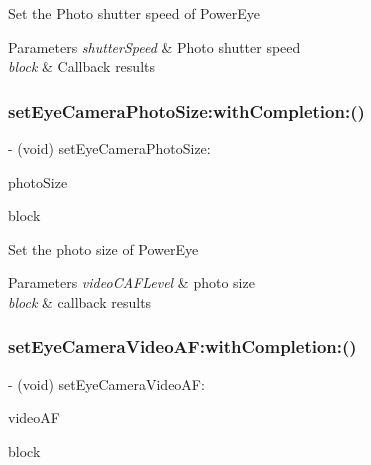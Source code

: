Set the Photo shutter speed of Power\+Eye


\begin{DoxyParams}{Parameters}
{\em shutter\+Speed} & Photo shutter speed \\
\hline
{\em block} & Callback results \\
\hline
\end{DoxyParams}
\mbox{\label{interface_p_v_camera_a6ffba1f6705e5bec4023b843e7e0d6d1}} 
\subsubsection{\texorpdfstring{set\+Eye\+Camera\+Photo\+Size\+:with\+Completion\+:()}{setEyeCameraPhotoSize:withCompletion:()}}
{\footnotesize\ttfamily -\/ (void) set\+Eye\+Camera\+Photo\+Size\+: \begin{DoxyParamCaption}\item[{(P\+V\+Camera\+Photo\+Size)}]{photo\+Size }\item[{withCompletion:(P\+V\+Completion\+Block)}]{block }\end{DoxyParamCaption}}

Set the photo size of Power\+Eye


\begin{DoxyParams}{Parameters}
{\em video\+C\+A\+F\+Level} & photo size \\
\hline
{\em block} & callback results \\
\hline
\end{DoxyParams}
\mbox{\label{interface_p_v_camera_ad967efa7d2d065bb1a5674a8ce139f7b}} 
\subsubsection{\texorpdfstring{set\+Eye\+Camera\+Video\+A\+F\+:with\+Completion\+:()}{setEyeCameraVideoAF:withCompletion:()}}
{\footnotesize\ttfamily -\/ (void) set\+Eye\+Camera\+Video\+A\+F\+: \begin{DoxyParamCaption}\item[{(P\+V\+Camera\+Video\+AF)}]{video\+AF }\item[{withCompletion:(P\+V\+Completion\+Block)}]{block }\end{DoxyParamCaption}}

